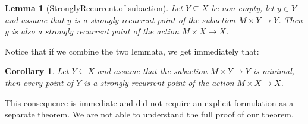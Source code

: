 \documentclass[11pt]{article}
\newtheorem{lemma}{Lemma}[section]
\newtheorem{corollary}{Corollary}[section]
\theoremstyle{definition}              %
\theoremstyle{definition}              %
\theoremstyle{definition}              %
\begin{document}
\begin{lemma}[StronglyRecurrent.of subaction]\label{lem3}
    Let $Y \subseteq X$ be non-empty, let $y \in Y$ and assume that $y$ is a strongly recurrent point of the subaction $M \times Y \to Y$. Then $y$ is also a strongly recurrent point of the action $M \times X \to X$.
\end{lemma}

Notice that if we combine the two lemmata, we get immediately that:

\begin{corollary}
    Let $Y \subseteq X$ and assume that the subaction $M \times Y \to Y$ is minimal, then every point of $Y$ is a strongly recurrent point of the action $M \times X \to X$.
\end{corollary}

This consequence is immediate and did not require an explicit formulation as a separate theorem. We are not able to understand the full proof of our theorem.
\end{document}
